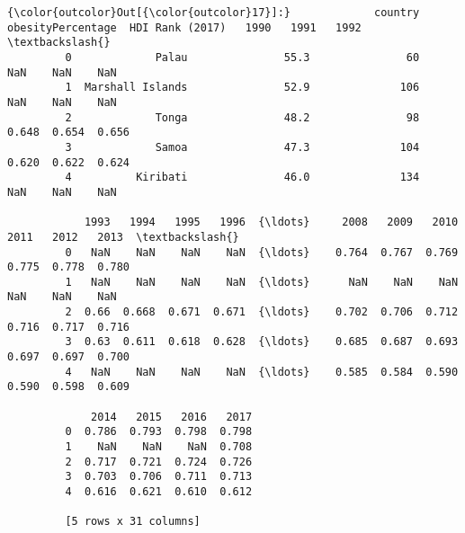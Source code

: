 \documentclass[11pt]{article}
\begin{document}
\begin{Verbatim}[commandchars=\\\{\}]
{\color{outcolor}Out[{\color{outcolor}17}]:}             country  obesityPercentage  HDI Rank (2017)   1990   1991   1992  \textbackslash{}
         0             Palau               55.3               60    NaN    NaN    NaN   
         1  Marshall Islands               52.9              106    NaN    NaN    NaN   
         2             Tonga               48.2               98  0.648  0.654  0.656   
         3             Samoa               47.3              104  0.620  0.622  0.624   
         4          Kiribati               46.0              134    NaN    NaN    NaN   
         
            1993   1994   1995   1996  {\ldots}     2008   2009   2010   2011   2012   2013  \textbackslash{}
         0   NaN    NaN    NaN    NaN  {\ldots}    0.764  0.767  0.769  0.775  0.778  0.780   
         1   NaN    NaN    NaN    NaN  {\ldots}      NaN    NaN    NaN    NaN    NaN    NaN   
         2  0.66  0.668  0.671  0.671  {\ldots}    0.702  0.706  0.712  0.716  0.717  0.716   
         3  0.63  0.611  0.618  0.628  {\ldots}    0.685  0.687  0.693  0.697  0.697  0.700   
         4   NaN    NaN    NaN    NaN  {\ldots}    0.585  0.584  0.590  0.590  0.598  0.609   
         
             2014   2015   2016   2017  
         0  0.786  0.793  0.798  0.798  
         1    NaN    NaN    NaN  0.708  
         2  0.717  0.721  0.724  0.726  
         3  0.703  0.706  0.711  0.713  
         4  0.616  0.621  0.610  0.612  
         
         [5 rows x 31 columns]
\end{Verbatim}
            
\end{document}
